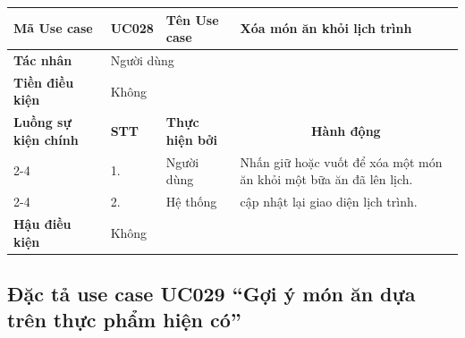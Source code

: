 \documentclass[../main.tex]{subfiles}
\begin{document}
\begin{longtable}{|p{2.7cm}|p{0.8cm}|p{2.6cm}|p{7.3cm}|}
\hline
\cellcolor[HTML]{D5F5E3}\textbf{Mã Use case} & \multicolumn{1}{l|}{UC028} & \cellcolor[HTML]{D5F5E3}\textbf{Tên Use case} & Xóa món ăn khỏi lịch trình \\ \hline
\cellcolor[HTML]{D5F5E3}\textbf{Tác nhân} & \multicolumn{3}{p{10.7cm}|}{Người dùng} \\ \hline
\cellcolor[HTML]{D5F5E3}\textbf{Tiền điều kiện} & \multicolumn{3}{p{10.7cm}|}{Không} \\ \hline

\cellcolor[HTML]{D5F5E3}\textbf{Luồng sự kiện chính} & \cellcolor[HTML]{FDEBD0}\textbf{STT} & \cellcolor[HTML]{FDEBD0}\textbf{Thực hiện bởi} & \multicolumn{1}{c|}{\cellcolor[HTML]{FDEBD0}\textbf{Hành động}} \\ \cline{2-4} 
\cellcolor[HTML]{D5F5E3} & 1. & Người dùng & Nhấn giữ hoặc vuốt để xóa một món ăn khỏi một bữa ăn đã lên lịch. \\ \cline{2-4} 
\cellcolor[HTML]{D5F5E3} & 2. & Hệ thống & cập nhật lại giao diện lịch trình. \\ \hline

\cellcolor[HTML]{D5F5E3}\textbf{Hậu điều kiện} & \multicolumn{3}{p{10.7cm}|}{Không} \\ \hline
\end{longtable}
\endgroup

\subsection{Đặc tả use case UC029 ``Gợi ý món ăn dựa trên thực phẩm hiện có''}
\vspace{0.5cm}

\begingroup
\renewcommand{\arraystretch}{1.5}
\end{document}
